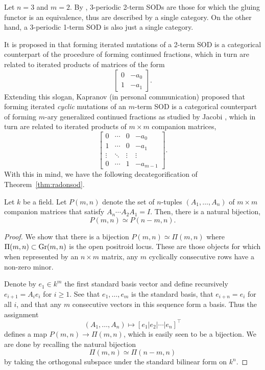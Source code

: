 \begin{eg}\label{eg:introx3y2}
    Let $n=3$ and $m=2$. By \cite{dyckerhoffNsphericalFunctorsCategorification2023}, $3$-periodic 2-term SODs are those for which the gluing functor is an equivalence, thus are described by a single category. On the other hand, a 3-periodic 1-term SOD is also just a single category.
\end{eg}

It is proposed in \cite{dyckerhoffNsphericalFunctorsCategorification2023} that forming iterated mutations of a 2-term SOD is a categorical counterpart of the procedure of forming continued fractions, which in turn are related to iterated products of matrices of the form
\[\begin{bmatrix}
0 & -a_0\\
1 & -a_1
\end{bmatrix}.\]
Extending this slogan, Kapranov (in personal communication) proposed that forming iterated \textit{cyclic} mutations of an $m$-term SOD is a categorical counterpart of forming $m$-ary generalized continued fractions as studied by Jacobi \cites{bernstein2006jacobi,lehmerJacobisExtensionContinued1918}, which in turn are related to iterated products of $m\times m$ companion matrices,
\[\begin{bmatrix}
0 & \cdots & 0 & -a_0\\
1 & \cdots & 0 & -a_1\\
\vdots & \ddots & \vdots & \vdots\\
0 & \cdots & 1 & -a_{m-1}
\end{bmatrix}.\]
With this in mind, we have the following decategorification of Theorem~\ref{thm:radonsod}.

\begin{prop}
    Let $k$ be a field. Let $P(m,n)$ denote the set of $n$-tuples $(A_1,\dots,A_n)$ of $m\times m$ companion matrices that satisfy $A_n\cdots A_2A_1 = I$. Then, there is a natural bijection,
    \[P(m,n)\simeq P(n-m,n).\]
\end{prop}

\begin{proof}
    We show that there is a bijection $P(m,n)\simeq \Pi(m,n)$ where $\Pi(m,n)\subset \operatorname{Gr}(m,n)$ is the open positroid locus. These are those objects for which when represented by an $n\times m$ matrix, any $m$ cyclically consecutive rows have a non-zero minor.
    
    Denote by $e_1\in k^m$ the first standard basis vector and define recursively $e_{i+1} = A_ie_i$ for $i\geq 1$. See that $e_1,\dots,e_m$ is the standard basis, that $e_{i+n}=e_i$ for all $i$, and that any $m$ consecutive vectors in this sequence form a basis. Thus the assignment
    \[(A_1,\dots,A_n)\mapsto [e_1|e_2|\cdots |e_n]^{\intercal}\]
    defines a map $P(m,n)\to \Pi(m,n)$, which is easily seen to be a bijection. We are done by recalling the natural bijection
    \[\Pi(m,n)\simeq \Pi(n-m,n)\]
    by taking the orthogonal subspace under the standard bilinear form on $k^n$.
\end{proof}

